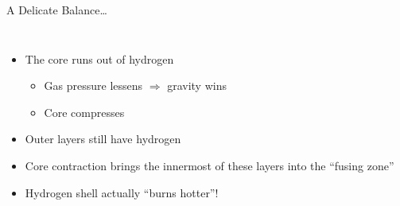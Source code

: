 \documentclass[pdf, aspectratio=169]{beamer}
\begin{document}
\begin{frame}{A Delicate Balance\ldots}
  \begin{columns}
	\begin{itemize}
	  \item The core runs out of hydrogen
		\begin{itemize}
		  \item Gas pressure lessens $\Rightarrow$ gravity wins
		  \item Core compresses
		\end{itemize}
	  \item<2-> Outer layers still have hydrogen
	  \item<2-> Core contraction brings the innermost of these layers into the ``fusing zone''
	  \item<2-> Hydrogen shell actually ``burns hotter''!
	\end{itemize}
  \end{columns}
\end{frame}
\end{document}
